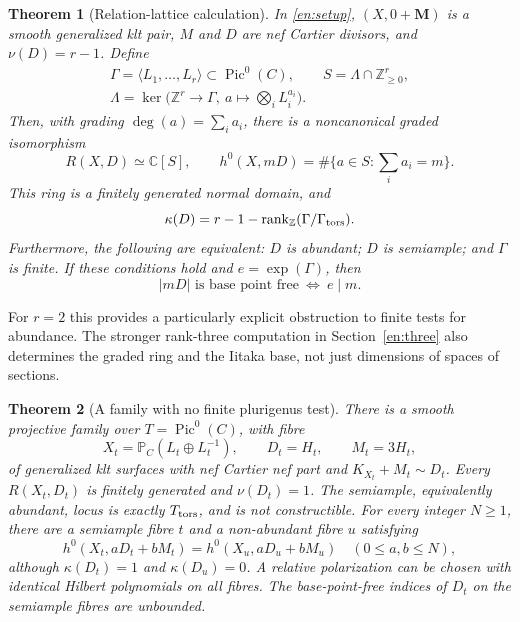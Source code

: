\documentclass[12pt]{amsart}
\newtheorem{thm}{Theorem}[section]
\theoremstyle{definition}
\theoremstyle{remark}
\numberwithin{equation}{section}
\newcommand{\rank}{\operatorname{rank}}
\newcommand{\Z}{\mathbb{Z}}
\newcommand{\C}{\mathbb{C}}
\newcommand{\mP}{\mathbb{P}}
\DeclareMathOperator{\Pic}{Pic}
\newcommand{\bM}{\mathbf M}
\newcommand{\NN}{\mathbb Z_{\geq0}}
\begin{document}
\begin{thm}[Relation-lattice calculation]\label{en:main}
In \eqref{en:setup}, $(X,0+\bM)$ is a smooth generalized klt pair, $M$ and $D$ are nef Cartier divisors, and $\nu(D)=r-1$. Define
\[
 \begin{gathered}
 \Gamma=\langle L_1,\ldots,L_r\rangle\subset\Pic^0(C),\qquad S=\Lambda\cap\NN^r,\\
 \Lambda=\ker\bigl(\Z^r\longrightarrow\Gamma,\ a\longmapsto\textstyle\bigotimes_i L_i^{a_i}\bigr).
 \end{gathered}
\]
Then, with grading $\deg(a)=\sum_i a_i$, there is a noncanonical graded isomorphism
\begin{equation}\label{en:ring}
 R(X,D)\simeq\C[S],\qquad
 h^0(X,mD)=\#\{a\in S:\textstyle\sum_i a_i=m\}.
\end{equation}
This ring is a finitely generated normal domain, and
\begin{equation}\label{en:kappa}
 \kappa(D)=r-1-\rank_{\Z}(\Gamma/\Gamma_{\rm tors}).
\end{equation}
Furthermore, the following are equivalent: $D$ is abundant; $D$ is semiample; and $\Gamma$ is finite. If these conditions hold and $e=\exp(\Gamma)$, then
\begin{equation}\label{en:bpf}
 |mD|\text{ is base point free}\ \Longleftrightarrow\ e\mid m.
\end{equation}
\end{thm}

For $r=2$ this provides a particularly explicit obstruction to finite tests for abundance. The stronger rank-three computation in Section~\ref{en:three} also determines the graded ring and the Iitaka base, not just dimensions of spaces of sections.

\begin{thm}[A family with no finite plurigenus test]\label{en:familyintro}
There is a smooth projective family over $T=\Pic^0(C)$, with fibre
\[
 X_t=\mP_C(L_t\oplus L_t^{-1}),\qquad D_t=H_t,\qquad M_t=3H_t,
\]
of generalized klt surfaces with nef Cartier nef part and $K_{X_t}+M_t\sim D_t$. Every $R(X_t,D_t)$ is finitely generated and $\nu(D_t)=1$. The semiample, equivalently abundant, locus is exactly $T_{\rm tors}$, and is not constructible. For every integer $N\geq1$, there are a semiample fibre $t$ and a non-abundant fibre $u$ satisfying
\[
 h^0(X_t,aD_t+bM_t)=h^0(X_u,aD_u+bM_u)
 \quad(0\leq a,b\leq N),
\]
although $\kappa(D_t)=1$ and $\kappa(D_u)=0$. A relative polarization can be chosen with identical Hilbert polynomials on all fibres. The base-point-free indices of $D_t$ on the semiample fibres are unbounded.
\end{thm}
\end{document}
